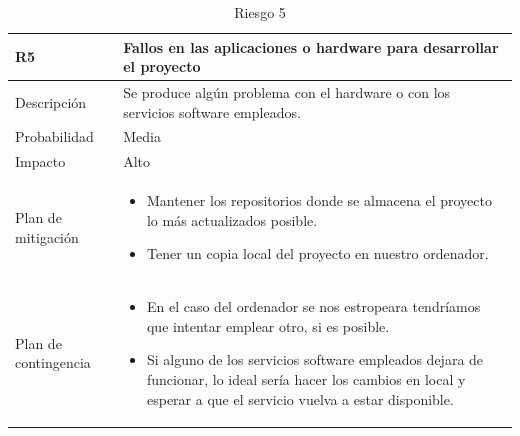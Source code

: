 \begin{table}[!htb]
    \footnotesize
    \begin{tabular}{|>{\arraybackslash}m{3.15cm} | >{\arraybackslash}m{10cm} |}
        \hline
        \vspace{0.5em} \textbf{ R5 } \vspace{0.5em} & \vspace{0.5em} \textbf{Fallos en las aplicaciones o hardware para desarrollar el proyecto} \vspace{0.5em} \\
        \hline 
        \vspace{0.5em} Descripción \vspace{0.5em} & \vspace{0.5em} Se produce algún problema con el hardware o con los servicios software empleados. \vspace{0.5em} \\
        \hline
        \vspace{0.5em} Probabilidad \vspace{0.5em} & \vspace{0.5em} Media \vspace{0.5em} \\
        \hline
        \vspace{0.5em} Impacto \vspace{0.5em} & \vspace{0.5em} Alto \vspace{0.5em} \\
        \hline
        Plan de mitigación & 
        \begin{itemize}
            \item Mantener los repositorios donde se almacena el proyecto lo más actualizados posible.
            \item Tener un copia local del proyecto en nuestro ordenador.
        \end{itemize} \\
        \hline
        Plan de contingencia & 
        \begin{itemize}
            \item En el caso del ordenador se nos estropeara tendríamos que intentar emplear otro, si es posible.
            \item Si alguno de los servicios software empleados dejara de funcionar, lo ideal sería hacer los cambios en local y esperar a que el servicio vuelva a estar disponible.
        \end{itemize} \\
        \hline
    \end{tabular}
    \caption{Riesgo 5}
    \label{tabla:riesgo5}
\end{table}

